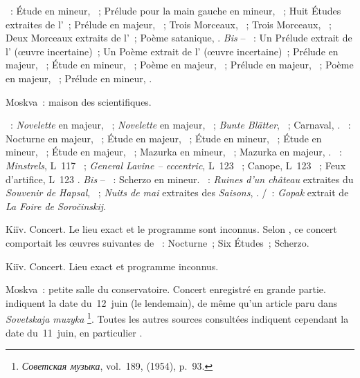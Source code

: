 \begin{description}
 \textsc{\Scriabine{}}~: Étude en \kC \Sharp mineur,  ~;
 Prélude pour la main gauche en \kC \Sharp mineur,  ~;
 Huit Études extraites de l'~; Prélude en \kE majeur, 
 ~; Trois Morceaux, ~; Trois Morceaux, ~; Deux
 Morceaux extraits de l'~; Poème satanique, .
 \emph{Bis} -- \textsc{\Scriabine{}}~: Un Prélude extrait de l'
 (œuvre incertaine)~; Un Poème extrait de l' (œuvre incertaine)~;
 Prélude en \kE \Flat majeur,  ~; Étude en \kD \Sharp
 mineur,  ~; Poème en \kF \Sharp majeur, 
 ~; Prélude en \kB majeur,  ~; Poème en \kD
 majeur,  ~; Prélude en \kF mineur,  .
 \item[\DateWithWeekDay{1954-05-10}]
 Moskva~: maison des scientifiques.

 \textsc{\Schumann{}}~: \emph{Novelette} en \kF majeur, 
 ~; \emph{Novelette} en \kE majeur,  ~;
 \emph{Bunte Blätter},  ~; Carnaval,
 .
 \textsc{\Chopin{}}~: Nocturne en \kF \Sharp majeur,  ~;
 Étude en \kG \Flat majeur,  ~; Étude en \kE \Flat
 mineur,  ~; Étude en \kF mineur,  ~;
 Étude en \kF majeur,  ~; Mazurka en \kF mineur,
  ~; Mazurka en \kC majeur,  .
 \textsc{\Debussy{}}~: \emph{Minstrels}, L~117 ~; \emph{General
 Lavine -- eccentric}, L~123 ~; Canope, L~123 ~;
 Feux d'artifice, L~123 .
 \emph{Bis} -- \textsc{\Goltz{}}~: Scherzo en \kE mineur.
 \textsc{\Tchaikovski{}}~: \emph{Ruines d'un château} extraites du
 \emph{Souvenir de Hapsal},  ~; \emph{Nuits de mai}
 extraites des \emph{Saisons},  .
 \textsc{\Moussorgski{}/\Rachmaninov{}}~: \emph{Gopak} extrait de \emph{La
 Foire de Soročinskij}.
 \item[\DateWithWeekDay{1954-05-25}]
 Kiïv.
 Concert.
 Le lieu exact et le programme sont inconnus.
 Selon \ASofronitsky{}, ce concert comportait les œuvres suivantes de
 \Chopin{}~: Nocturne~; Six Études~; Scherzo.
 \item[\DateWithWeekDay{1954-05-27}]
 Kiïv.
 Concert.
 Lieu exact et programme inconnus.
 \item[\DateWithWeekDay{1954-06-11}]
 Moskva~: petite salle du conservatoire.
 Concert enregistré en grande partie.
 \citet[p.~437]{Scriabine} indiquent la date du~12~juin (le lendemain), de
 même qu'un article paru dans \emph{Sovetskaja muzyka}%
 \footnote{\foreignlanguage{russian}{\emph{Советская музыка}}, vol.~189,
  (1954), p.~93.}.
 Toutes les autres sources consultées indiquent cependant la date
 du~11~juin, en particulier \citet[p.~177]{Nekrasova08}.


\end{description}
